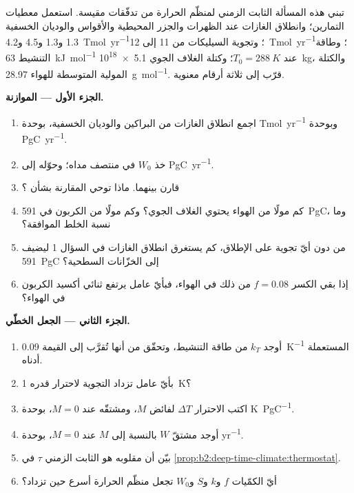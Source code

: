 \begin{problem}\label{pb:b2:deep-time-climate:1}
تبني هذه المسألة الثابت الزمني لمنظّم الحرارة من تدفّقات مقيسة. استعمل معطيات
التمارين؛ وانطلاق الغازات عند الظهرات والجزر المحيطية والأقواس والوديان الخسفية \num{1.3} و\num{1.3} و4.5
و\qty{4.2}{Tmol.yr^{-1}}؛ وتجوية السيليكات من 11 إلى \qty{12}{Tmol.yr^{-1}}؛ وطاقة التنشيط
\qty{63}{kJ.mol^{-1}} عند $T_0 = \qty{288}{K}$؛ وكتلة الغلاف الجوي \qty{5.1e18}{kg}، والكتلة المولية
المتوسطة للهواء \qty{28.97}{g.mol^{-1}}. قرّب إلى ثلاثة أرقام معنوية.

\noindent\textbf{الجزء الأول --- الموازنة.}
\begin{enumerate}
  \item اجمع انطلاق الغازات من البراكين والوديان الخسفية، بوحدة \unit{Tmol.yr^{-1}} وبوحدة \unit{PgC.yr^{-1}}.
  \item خذ $W_0$ في منتصف مداه؛ وحوّله إلى \unit{PgC.yr^{-1}}.
  \item قارن بينهما. ماذا توحي المقارنة بشأن ؟
  \item كم مولًا من الهواء يحتوي الغلاف الجوي؟ وكم مولًا من الكربون في \qty{591}{PgC}،
        وما نسبة الخلط الموافقة؟
  \item من دون أيّ تجوية على الإطلاق، كم يستغرق انطلاق الغازات في السؤال 1 ليضيف
        \qty{591}{PgC} إلى الخزّانات السطحية؟
  \item إذا بقي الكسر $f = 0.08$ من ذلك في الهواء، فبأيّ عامل يرتفع ثنائي أكسيد الكربون
        في الهواء؟
\end{enumerate}

\noindent\textbf{الجزء الثاني --- الجعل الخطّي.}
\begin{enumerate}[resume]
  \item أوجد $k_T$ من طاقة التنشيط، وتحقّق من أنها تُقرَّب إلى القيمة
        \qty{0.09}{K^{-1}} المستعملة أدناه.
  \item بأيّ عامل تزداد التجوية لاحترار قدره \qty{1}{K}؟
  \item اكتب الاحترار $\Delta T$ لفائض $M$، ومشتقّه عند $M = 0$، بوحدة
        \unit{K.PgC^{-1}}.
  \item أوجد مشتقّ $W$ بالنسبة إلى $M$ عند $M = 0$، بوحدة \unit{yr^{-1}}.
  \item بيّن أن مقلوبه هو الثابت الزمني $\tau$ في
        \cref{prop:b2:deep-time-climate:thermostat}.
  \item أيّ الكمّيات $f$ و$k$ و$S$ و$W_0$ تجعل منظّم الحرارة أسرع حين تزداد؟
\end{enumerate}


\end{problem}

